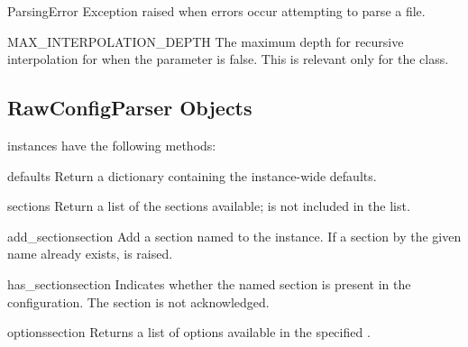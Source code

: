\begin{excdesc}{ParsingError}
Exception raised when errors occur attempting to parse a file.
\end{excdesc}

\begin{datadesc}{MAX_INTERPOLATION_DEPTH}
The maximum depth for recursive interpolation for  when
the  parameter is false.  This is relevant only for the
 class.
\end{datadesc}


\begin{seealso}
\end{seealso}


\subsection{RawConfigParser Objects \label{RawConfigParser-objects}}

 instances have the following methods:

\begin{methoddesc}{defaults}{}
Return a dictionary containing the instance-wide defaults.
\end{methoddesc}

\begin{methoddesc}{sections}{}
Return a list of the sections available;  is not
included in the list.
\end{methoddesc}

\begin{methoddesc}{add_section}{section}
Add a section named  to the instance.  If a section by
the given name already exists,  is
raised.
\end{methoddesc}

\begin{methoddesc}{has_section}{section}
Indicates whether the named section is present in the
configuration. The  section is not acknowledged.
\end{methoddesc}

\begin{methoddesc}{options}{section}
Returns a list of options available in the specified .
\end{methoddesc}

